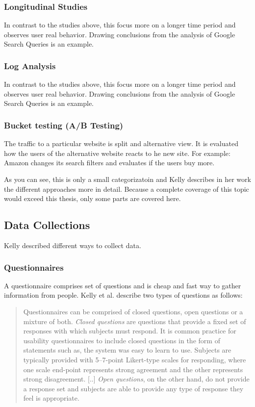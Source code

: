 \documentclass[11pt]{report}
\begin{document}
\subsubsection{Longitudinal Studies}
In contrast to the studies above, this focus more on a longer time period and observes user real behavior. Drawing conclusions from the analysis of Google Search Queries is an example.

\subsubsection{Log Analysis}
In contrast to the studies above, this focus more on a longer time period and observes user real behavior. Drawing conclusions from the analysis of Google Search Queries is an example.

\subsubsection{Bucket testing (A/B Testing)}
The traffic to a particular website is split and alternative view. It is evaluated how the users of the alternative website reacts to he new site. For example: Amazon changes its search filters and evaluates if the users buy more.

As you can see, this is only a small categorizatoin and Kelly describes in her work the different approaches more in detail. Because a complete coverage of this topic would exceed this thesis, only some parts are covered here. 

\subsection{Data Collections}

Kelly described different ways to collect data.

\subsubsection{Questionnaires}

A questionnaire comprises set of questions and is cheap and fast way to gather information from people. Kelly et al. \cite{Kelly2008} describe two types of questions as follows:

\begin{quote}
	Questionnaires can be comprised of closed questions, open questions or a mixture of both. \textit{Closed questions} are questions that provide a fixed set of responses with which subjects must respond. It is common practice for usability questionnaires to include closed questions in the form of statements such as, the system was easy to learn to use. Subjects are typically provided with 5–7-point Likert-type scales for responding, where one scale end-point represents strong agreement and the other represents strong disagreement. [..] \textit{Open questions}, on the other hand, do not provide a response set and subjects are able to provide any type of response they feel is appropriate. 
	\end{quote}
\end{document}
